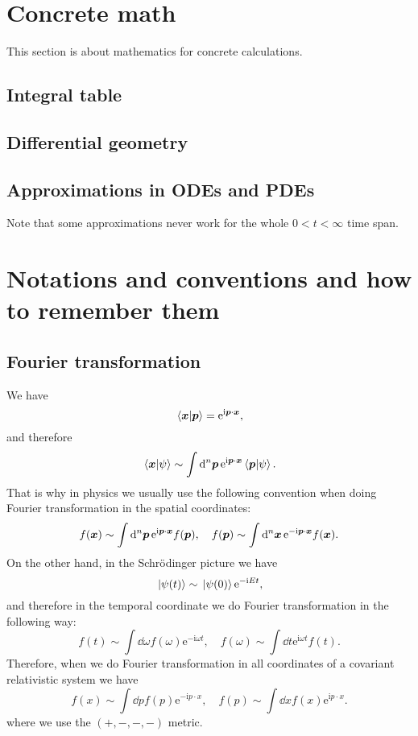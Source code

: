 \documentclass[hyperref, a4paper]{article}
\newcommand*{\ii}{\mathrm{i}}
\newcommand*{\ee}{\mathrm{e}}
\begin{document}
\section{Concrete math}

This section is about mathematics for concrete calculations.

\subsection{Integral table}

\subsection{Differential geometry}

\subsection{Approximations in ODEs and PDEs}

Note that some approximations never work for the whole $0 < t < \infty$ time span.

\section{Notations and conventions and how to remember them}

\subsection{Fourier transformation}

We have 
\[
    \braket*{\vb*{x}}{\vb*{p}} = \ee^{\ii \vb*{p} \cdot \vb*{x}},
\]
and therefore 
\[
    \braket*{\vb*{x}}{\psi} \sim \int \dd[n]{\vb*{p}} \ee^{\ii \vb*{p} \cdot \vb*{x}} \braket*{\vb*{p}}{\psi}.
\]
That is why in physics we usually use the following convention when doing Fourier transformation in the spatial coordinates:
\begin{equation}
    f(\vb*{x}) \sim \int \dd[n]{\vb*{p}} \ee^{\ii \vb*{p} \cdot \vb*{x}} f(\vb*{p}), \quad f(\vb*{p}) \sim \int \dd[n]{\vb*{x}} \ee^{- \ii \vb*{p} \cdot \vb*{x}} f(\vb*{x}).
\end{equation}
On the other hand, in the Schrödinger picture we have 
\[
    \ket*{\psi(t)} \sim \ket*{\psi(0)} \ee^{- \ii E t},
\]
and therefore in the temporal coordinate we do Fourier transformation in the following way:
\begin{equation}
    f(t) \sim \int \dd{\omega} f(\omega) \ee^{- \ii \omega t}, \quad f(\omega) \sim \int \dd{t} \ee^{\ii \omega t} f(t).
\end{equation}
Therefore, when we do Fourier transformation in all coordinates of a covariant relativistic system we have 
\begin{equation}
    f(x) \sim \int \dd{p} f(p) \ee^{- \ii p \cdot x}, \quad f(p) \sim \int \dd{x} f(x) \ee^{\ii p \cdot x}.
\end{equation}
where we use the $(+, -, -, -)$ metric.
\end{document}
